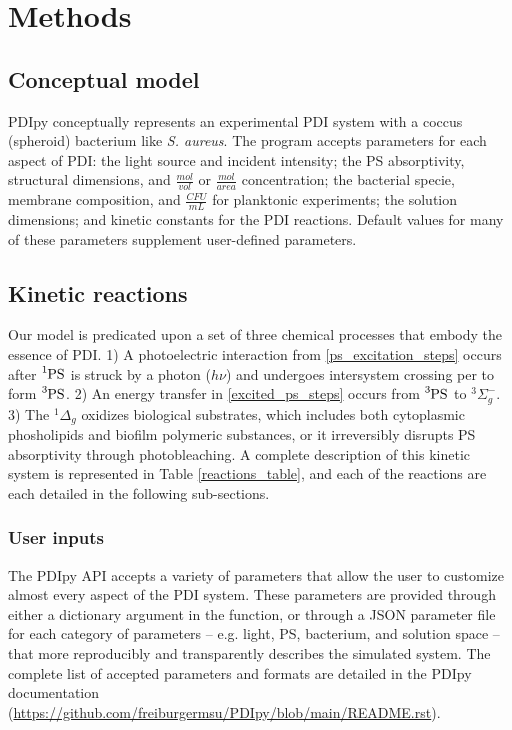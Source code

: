 \section{Methods} \label{methods}
\subsection{Conceptual model}
PDIpy conceptually represents an experimental PDI system with a coccus (spheroid) bacterium like \textit{S. aureus}. The program accepts parameters for each aspect of PDI: the light source and incident intensity; the PS absorptivity, structural dimensions, and $\frac{mol}{vol}$ or $\frac{mol}{area}$ concentration; the bacterial specie, membrane composition, and $\frac{CFU}{mL}$ for planktonic experiments; the solution dimensions; and kinetic constants for the PDI reactions. Default values for many of these parameters supplement user-defined parameters.

\subsection{Kinetic reactions}
Our model is predicated upon a set of three chemical processes that embody the essence of PDI. 1) A photoelectric interaction \cite{Wheaton2009PhotoelectricEffect} from \cref{ps_excitation_steps} occurs after $\ce{^1PS}$ is struck by a photon ($h\nu$) and undergoes intersystem crossing per to form $\ce{^3PS}$. 2) An energy transfer in \cref{excited_ps_steps} occurs from $\ce{^3PS}$ to $^3\Sigma_g^-$. 3) The $^1\Delta_g$ oxidizes biological substrates, which includes both cytoplasmic phosholipids and biofilm polymeric substances, or it irreversibly disrupts PS absorptivity through photobleaching. A complete description of this kinetic system is represented in Table \ref{reactions_table}, and each of the reactions are each detailed in the following sub-sections.

\subsubsection{User inputs}
The PDIpy API accepts a variety of parameters that allow the user to customize almost every aspect of the PDI system. These parameters are provided through either a dictionary argument in the  function, or through a JSON parameter file for each category of parameters -- e.g. light, PS, bacterium, and solution space -- that more reproducibly and transparently describes the simulated system. The complete list of accepted parameters and formats are detailed in the PDIpy documentation (\url{https://github.com/freiburgermsu/PDIpy/blob/main/README.rst}).

